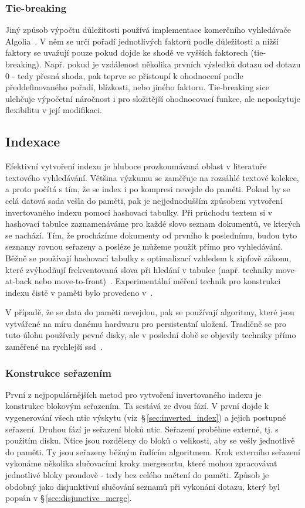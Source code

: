 \documentclass[11pt,letterpaper,oneside,openright]{book}
\begin{document}
\subsubsection{Tie-breaking} \label{sec:tie-breaking}
Jiný způsob výpočtu důležitosti používá implementace komerčního vyhledávače
Algolia~\cite{algolia_ranking}. V něm se určí pořadí jednotlivých faktorů podle
důležitosti a nižší faktory se uvažují pouze pokud dojde ke shodě ve vyšších
faktorech (tie-breaking). Např.  pokud je vzdálenost několika prvních výsledků
dotazu od dotazu 0 - tedy přesná shoda, pak teprve se přistoupí k ohodnocení
podle předdefinovaného pořadí, blízkosti, nebo jiného faktoru. Tie-breaking
sice ulehčuje výpočetní náročnost i pro složitější ohodnocovací funkce, ale
neposkytuje flexibilitu v její modifikaci.

\subsection{Indexace}
Efektivní vytvoření indexu je hluboce prozkoumávaná oblast v literatuře
textového vyhledávání. Většina výzkumu se zaměřuje na rozsáhlé textové kolekce,
a proto počítá s tím, že se index i po kompresi nevejde do paměti. Pokud by se
celá datová sada vešla do paměti, pak je nejjednodušším způsobem vytvoření
invertovaného indexu pomocí hashovací tabulky. Při průchodu textem si v
hashovací tabulce zaznamenáváme pro každé slovo seznam dokumentů, ve kterých se
nachází. Tím, že procházíme dokumenty od prvního k poslednímu, budou tyto
seznamy rovnou seřazeny a posléze je můžeme použít přímo pro vyhledávání. Běžně
se používají hashovací tabulky s optimalizací vzhledem k zipfově zákonu, které
zvýhodňují frekventovaná slova při hledání v tabulce (např. techniky
move-at-back nebo move-to-front)~\cite{ZOBEL2001271}. Experimentální měření
technik pro konstrukci indexu čistě v paměti bylo provedeno
v~\cite{Buttcher05memorymanagement}.

V případě, že se data do paměti nevejdou, pak se používají algoritmy, které
jsou vytvářené na míru danému hardwaru pro persistentní uložení. Tradičně se
pro tuto úlohu používaly pevné disky, ale v poslední době se objevily techniky
přímo zaměřené na rychlejší ssd~\cite{Jung201525}.

\subsubsection{Konstrukce seřazením}
První z nejpopulárnějších metod pro vytvoření invertovaného indexu je
konstrukce blokovým seřazením. Ta sestává ze dvou fází.  V první dojde k
vygenerování všech ntic výskytu (viz~\S\,\ref{sec:inverted_index}) a jejich
postupné seřazení. Druhou fází je seřazení bloků ntic. Seřazení proběhne
externě, tj. s použitím disku. Ntice jsou rozděleny do bloků o velikosti, aby
se vešly jednotlivě do paměti. Ty jsou seřazeny běžným řadícím algoritmem. Krok
externího seřazení vykonáme několika slučovacími kroky mergesortu, které mohou
zpracovávat jednotlivé bloky proudově - tedy bez celého načtení do paměti.
Způsob je obdobný jako disjunktivní slučování seznamů při vykonání dotazu,
který byl popsán v \S\,\ref{sec:disjunctive_merge}.
\end{document}
